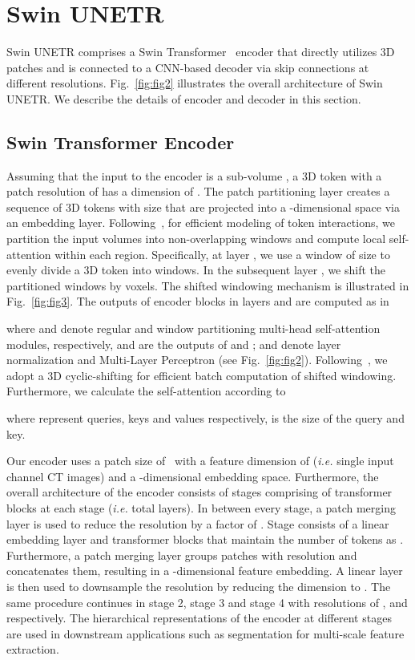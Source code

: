 \documentclass[10pt,twocolumn,letterpaper]{article}
\begin{document}
\section{Swin UNETR}
Swin UNETR comprises a Swin Transformer~\cite{liu2021swin} encoder that directly utilizes 3D patches and is connected to a CNN-based decoder via skip connections at different resolutions. Fig.~\ref{fig:fig2} illustrates the overall architecture of Swin UNETR. We describe the details of encoder and decoder in this section.   
\subsection{Swin Transformer Encoder}
Assuming that the input to the encoder is a sub-volume , a 3D token with a patch resolution of  has a dimension of . The patch partitioning layer creates a sequence of 3D tokens with size   that are projected into a -dimensional space via an embedding layer. Following~\cite{liu2021swin}, for efficient modeling of token interactions, we partition the input volumes into non-overlapping windows and compute local self-attention within each region. Specifically, at layer , we use a window of size  to evenly divide a 3D token into  windows. In the subsequent layer , we shift the partitioned windows by  voxels. The shifted windowing mechanism is illustrated in Fig.~\ref{fig:fig3}. The outputs of encoder blocks in layers  and  are computed as in

where  and  denote regular and window partitioning multi-head self-attention modules, respectively,   and  are the outputs of  and ;  and  denote layer normalization and Multi-Layer Perceptron (see Fig.~\ref{fig:fig2}). Following~\cite{liu2021swin}, we adopt a 3D cyclic-shifting for efficient batch computation of shifted windowing. Furthermore, we calculate the self-attention according to

where  represent queries, keys and values respectively,  is the size of the query and key.

Our encoder uses a patch size of ~with a feature dimension of  (\textit{i.e.} single input channel CT images) and a -dimensional embedding space. Furthermore, the overall architecture of the encoder consists of  stages comprising of  transformer blocks at each stage (\textit{i.e.}  total layers). In between every stage, a patch merging layer is used to reduce the resolution by a factor of . Stage  consists of a linear embedding layer and transformer blocks that maintain the number of tokens as . Furthermore, a patch merging layer groups patches with resolution  and concatenates them, resulting in a -dimensional feature embedding. A linear layer is then used to downsample the resolution by reducing the dimension to . The same procedure continues in stage 2, stage 3 and stage 4 with resolutions of ,  and  respectively. The hierarchical representations of the encoder at different stages are used in downstream applications such as segmentation for multi-scale feature extraction.
\end{document}
